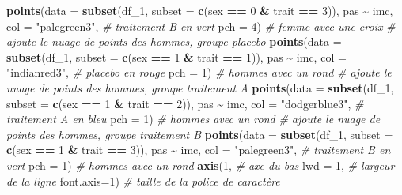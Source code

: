 \documentclass[
]{book}
\newenvironment{Shaded}{\begin{snugshade}}{\end{snugshade}}
\newcommand{\AttributeTok}[1]{\textcolor[rgb]{0.13,0.29,0.53}{#1}}
\newcommand{\CommentTok}[1]{\textcolor[rgb]{0.56,0.35,0.01}{\textit{#1}}}
\newcommand{\DecValTok}[1]{\textcolor[rgb]{0.00,0.00,0.81}{#1}}
\newcommand{\FunctionTok}[1]{\textcolor[rgb]{0.13,0.29,0.53}{\textbf{#1}}}
\newcommand{\NormalTok}[1]{#1}
\newcommand{\SpecialCharTok}[1]{\textcolor[rgb]{0.81,0.36,0.00}{\textbf{#1}}}
\newcommand{\StringTok}[1]{\textcolor[rgb]{0.31,0.60,0.02}{#1}}
\begin{document}
\begin{Shaded}
\begin{Highlighting}[]
\FunctionTok{points}\NormalTok{(}\AttributeTok{data =} \FunctionTok{subset}\NormalTok{(df\_1, }\AttributeTok{subset =} \FunctionTok{c}\NormalTok{(sex }\SpecialCharTok{==} \DecValTok{0} \SpecialCharTok{\&}\NormalTok{ trait }\SpecialCharTok{==} \DecValTok{3}\NormalTok{)), }
\NormalTok{       pas }\SpecialCharTok{\textasciitilde{}}\NormalTok{ imc, }
       \AttributeTok{col =} \StringTok{"palegreen3"}\NormalTok{, }\CommentTok{\# traitement B en vert}
       \AttributeTok{pch =} \DecValTok{4}\NormalTok{) }\CommentTok{\# femme avec une croix}
\CommentTok{\# ajoute le nuage de points des hommes, groupe placebo}
\FunctionTok{points}\NormalTok{(}\AttributeTok{data =} \FunctionTok{subset}\NormalTok{(df\_1, }\AttributeTok{subset =} \FunctionTok{c}\NormalTok{(sex }\SpecialCharTok{==} \DecValTok{1} \SpecialCharTok{\&}\NormalTok{ trait }\SpecialCharTok{==} \DecValTok{1}\NormalTok{)), }
\NormalTok{       pas }\SpecialCharTok{\textasciitilde{}}\NormalTok{ imc, }
       \AttributeTok{col =} \StringTok{"indianred3"}\NormalTok{, }\CommentTok{\# placebo en rouge}
       \AttributeTok{pch =} \DecValTok{1}\NormalTok{) }\CommentTok{\# hommes avec un rond}
\CommentTok{\# ajoute le nuage de points des hommes, groupe traitement A}
\FunctionTok{points}\NormalTok{(}\AttributeTok{data =} \FunctionTok{subset}\NormalTok{(df\_1, }\AttributeTok{subset =} \FunctionTok{c}\NormalTok{(sex }\SpecialCharTok{==} \DecValTok{1} \SpecialCharTok{\&}\NormalTok{ trait }\SpecialCharTok{==} \DecValTok{2}\NormalTok{)), }
\NormalTok{       pas }\SpecialCharTok{\textasciitilde{}}\NormalTok{ imc, }
       \AttributeTok{col =} \StringTok{"dodgerblue3"}\NormalTok{, }\CommentTok{\# traitement A en bleu}
       \AttributeTok{pch =} \DecValTok{1}\NormalTok{) }\CommentTok{\# hommes avec un rond}
\CommentTok{\# ajoute le nuage de points des hommes, groupe traitement B}
\FunctionTok{points}\NormalTok{(}\AttributeTok{data =} \FunctionTok{subset}\NormalTok{(df\_1, }\AttributeTok{subset =} \FunctionTok{c}\NormalTok{(sex }\SpecialCharTok{==} \DecValTok{1} \SpecialCharTok{\&}\NormalTok{ trait }\SpecialCharTok{==} \DecValTok{3}\NormalTok{)), }
\NormalTok{       pas }\SpecialCharTok{\textasciitilde{}}\NormalTok{ imc, }
       \AttributeTok{col =} \StringTok{"palegreen3"}\NormalTok{, }\CommentTok{\# traitement B en vert}
       \AttributeTok{pch =} \DecValTok{1}\NormalTok{) }\CommentTok{\# hommes avec un rond}
\FunctionTok{axis}\NormalTok{(}\DecValTok{1}\NormalTok{, }\CommentTok{\# axe du bas}
     \AttributeTok{lwd =} \DecValTok{1}\NormalTok{, }\CommentTok{\# largeur de la ligne}
     \AttributeTok{font.axis=}\DecValTok{1}\NormalTok{) }\CommentTok{\# taille de la police de caractère}

\end{Highlighting}
\end{Shaded}
\end{document}
